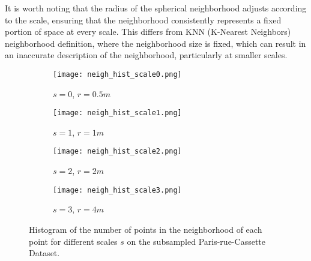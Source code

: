 \documentclass{article}
\begin{document}
It is worth noting that the radius of the spherical neighborhood adjusts according to the scale, ensuring that the neighborhood consistently represents a fixed portion of space at every scale. This differs from KNN (K-Nearest Neighbors) neighborhood definition, where the neighborhood size is fixed, which can result in an inaccurate description of the neighborhood, particularly at smaller scales.

\begin{figure}
    \begin{subfigure}{0.5\textwidth}
        \centering
        \texttt{[image: neigh\_hist\_scale0.png]}
        \caption{$s=0$, $r=0.5m$}
    \end{subfigure}
    \hfill
    \begin{subfigure}{0.5\textwidth}
        \centering
        \texttt{[image: neigh\_hist\_scale1.png]}
        \caption{$s=1$, $r=1m$}
    \end{subfigure}
    \hfill
    \begin{subfigure}{0.5\textwidth}
        \centering
        \texttt{[image: neigh\_hist\_scale2.png]}
        \caption{$s=2$, $r=2m$}
    \end{subfigure}
    \hfill
    \begin{subfigure}{0.5\textwidth}
        \centering
        \texttt{[image: neigh\_hist\_scale3.png]}
        \caption{$s=3$, $r=4m$}
    \end{subfigure}
    \caption{Histogram of the number of points in the neighborhood of each point for different scales $s$ on the subsampled Paris-rue-Cassette Dataset.}
    \label{fig:neigh_hist}
\end{figure}
\end{document}
